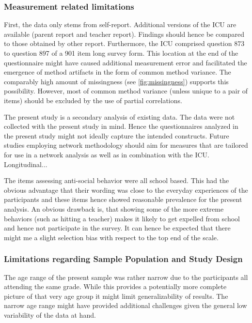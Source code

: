 \subsubsection{Measurement related limitations}
First, the data only stems from self-report. 
Additional versions of the ICU are available (parent report and teacher report).
Findings should hence be compared to those obtained by other report. 
Furthermore, the ICU comprised question 873 to question 897 of a 901 item long survey form.
This location at the end of the questionnaire might have caused additional measurement error and facilitated the emergence of method artifacts in the form of common method variance.
The comparably high amount of missingness (see \ref{fig:missingness}) supports this possibility.
However, most of common method variance (unless unique to a pair of items) should be excluded by the use of partial correlations.

The present study is a secondary analysis of existing data. 
The data were not collected with the present study in mind. 
Hence the questionnaires analyzed in the present study might not ideally capture the intended constructs.
Future studies employing network methodology should aim for measures that are tailored for use in a network analysis as well as in combination with the ICU.
Longitudinal...

The items assessing anti-social behavior were all school based. 
This had the obvious advantage that their wording was close to the everyday experiences of the participants and these items hence showed reasonable prevalence for the present analysis.
An obvious drawback is, that showing some of the more extreme behaviors (such as hitting a teacher) makes it likely to get expelled from school and hence not participate in the survey.
It can hence be expected that there might me a slight selection bias with respect to the top end of the scale.


\subsubsection{Limitations regarding Sample Population and Study Design}

The age range of the present sample was rather narrow due to the participants all attending the same grade.
While this provides a potentially more complete picture of that very age group it might limit generalizability of results.
The narrow age range might have provided additional challenges given the general low variability of the data at hand.

